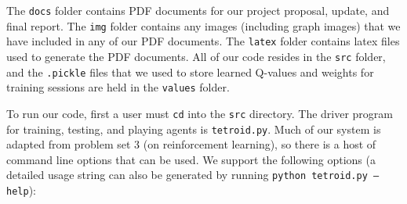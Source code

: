 \documentclass[11pt]{article}
\begin{document}
\bigskip

The \texttt{docs} folder contains PDF documents for our project proposal, update, and final report. The \texttt{img} folder contains any images (including graph images) that we have included in any of our PDF documents. The \texttt{latex} folder contains latex files used to generate the PDF documents. All of our code resides in the \texttt{src} folder, and the \texttt{.pickle} files that we used to store learned Q-values and weights for training sessions are held in the \texttt{values} folder.

\bigskip

To run our code, first a user must \texttt{cd} into the \texttt{src} directory. The driver program for training, testing, and playing agents is \texttt{tetroid.py}. Much of our system is adapted from problem set 3 (on reinforcement learning), so there is a host of command line options that can be used. We support the following options (a detailed usage string can also be generated by running \texttt{python tetroid.py --help}):
\end{document}
